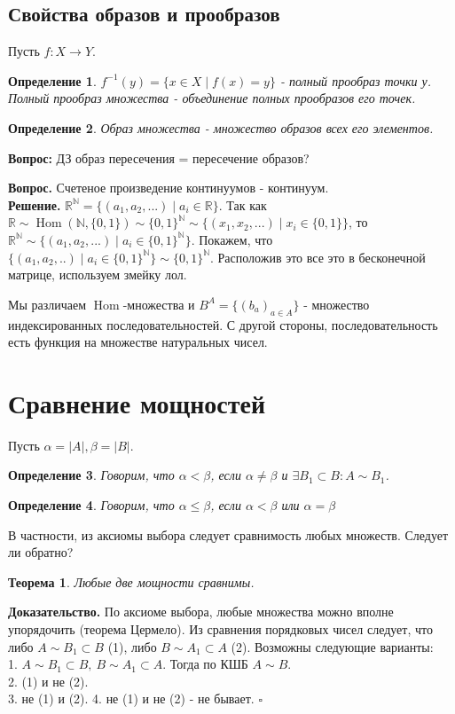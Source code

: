\documentclass[a4paper]{article}
\newtheorem{defin}{Определение}
\newtheorem{theor}{Теорема}
\DeclareMathOperator{\Hom}{Hom}
\begin{document}
\subsection{Свойства образов и прообразов}
Пусть $f\colon X\to Y$. 
\begin{defin}
$f^{-1}(y)=\{x\in X\mid f(x)=y\}$ - полный прообраз точки у.
Полный прообраз множества - объединение полных прообразов его точек.
\end{defin}
\begin{defin}
Образ множества - множество образов всех его элементов. 
\end{defin}
\textbf{Вопрос:} ДЗ образ пересечения = пересечение образов?


\textbf{Вопрос.} Счетеное произведение континуумов - континуум. \\
\textbf{Решение.} 
$\mathbb{R}^\mathbb{N}=\{(a_1,a_2,...)\mid a_i \in \mathbb{R}\}$. Так как
$\mathbb{R}\sim \Hom(\mathbb{N},\{0,1\})\sim \{0,1\}^\mathbb{N}\sim
 \{(x_1,x_2,...)\mid x_i\in \{0,1\}\}$, то $\mathbb{R}^\mathbb{N}\sim
\{(a_1,a_2,...)\mid a_i\in \{0,1\}^\mathbb{N}\}$. Покажем, что
$\{(a_1,a_2,..)\mid a_i\in \{0,1\}^\mathbb{N} \} \sim \{0,1\}^\mathbb{N}$. 
Расположив это все это в бесконечной матрице, используем змейку лол. 




Мы различаем $\Hom$-множества и  $B^A = \{(b_a)_{a\in A}\}$ - множество
индексированных последовательностей. С другой стороны, последовательность 
есть функция на множестве натуральных чисел. 

\section{Сравнение мощностей}
Пусть $\alpha=|A|,\beta = |B|$. 
\begin{defin}
Говорим, что $\alpha<\beta$, если $\alpha\ne \beta$ и
$\exists  B_1\subset B:A\sim B_1$. 
\end{defin}
\begin{defin}
Говорим, что $\alpha\leqslant \beta$, если $\alpha < \beta$ или 
$\alpha=\beta$
\end{defin}
В частности, из аксиомы выбора следует сравнимость любых множеств. 
Следует ли обратно?
\begin{theor}
Любые две мощности сравнимы.
\end{theor}
\textbf{Доказательство.} По аксиоме выбора, любые множества можно вполне
упорядочить (теорема Цермело). Из сравнения порядковых чисел 
следует, что либо $A\sim B_1\subset B$ (1), либо $B\sim A_1\subset A$ (2).
Возможны 
следующие варианты:\\
1. $A\sim B_1\subset B,~B\sim A_1\subset A$. Тогда по КШБ $A\sim B$.\\
2.  (1) и не (2). \\
3. не (1) и (2). 
4. не (1) и не (2) - не бывает. 
$\square$ \\
\end{document}
